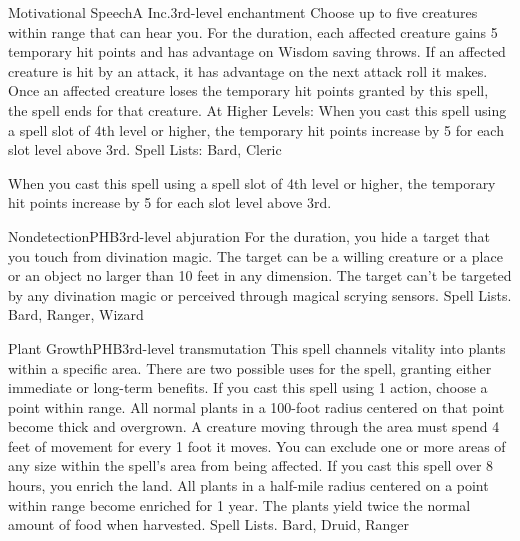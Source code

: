 \begin{spell}{Motivational Speech}{A Inc.}{3rd-level enchantment}
{
}
Choose up to five creatures within range that can hear you. For the duration, each affected creature gains 5 temporary hit points and has advantage on Wisdom saving throws. If an affected creature is hit by an attack, it has advantage on the next attack roll it makes. Once an affected creature loses the temporary hit points granted by this spell, the spell ends for that creature.
At Higher Levels: When you cast this spell using a spell slot of 4th level or higher, the temporary hit points increase by 5 for each slot level above 3rd.
Spell Lists: Bard, Cleric

 When you cast this spell using a spell slot of 4th level or higher, the temporary hit points increase by 5 for each slot level above 3rd.
\end{spell}

\begin{spell}{Nondetection}{PHB}{3rd-level abjuration}
{
}
For the duration, you hide a target that you touch from divination magic. The target can be a willing creature or a place or an object no larger than 10 feet in any dimension. The target can’t be targeted by any divination magic or perceived through magical scrying sensors.
Spell Lists. Bard, Ranger, Wizard
\end{spell}

\begin{spell}{Plant Growth}{PHB}{3rd-level transmutation}
{
}
This spell channels vitality into plants within a specific area. There are two possible uses for the spell, granting either immediate or long-term benefits.
If you cast this spell using 1 action, choose a point within range. All normal plants in a 100-foot radius centered on that point become thick and overgrown. A creature moving through the area must spend 4 feet of movement for every 1 foot it moves.
You can exclude one or more areas of any size within the spell’s area from being affected.
If you cast this spell over 8 hours, you enrich the land. All plants in a half-mile radius centered on a point within range become enriched for 1 year. The plants yield twice the normal amount of food when harvested.
Spell Lists. Bard, Druid, Ranger
\end{spell}

